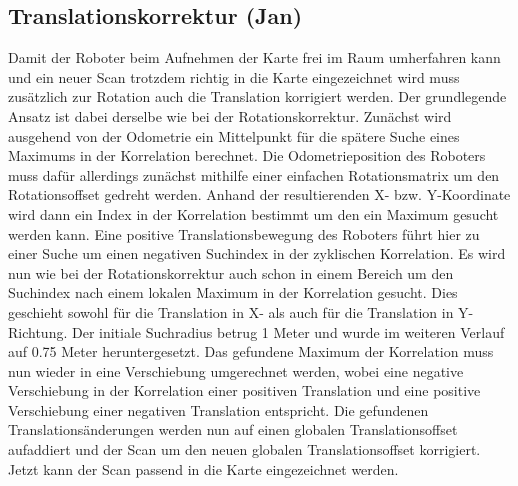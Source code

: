 \subsection{Translationskorrektur (Jan)}

Damit der Roboter beim Aufnehmen der Karte frei im Raum umherfahren kann und ein neuer Scan trotzdem richtig in die Karte eingezeichnet wird muss zusätzlich zur Rotation auch die Translation korrigiert werden. Der grundlegende Ansatz ist dabei derselbe wie bei der Rotationskorrektur. Zunächst wird ausgehend von der Odometrie ein Mittelpunkt für die spätere Suche eines Maximums in der Korrelation berechnet. Die Odometrieposition des Roboters muss dafür allerdings zunächst mithilfe einer einfachen Rotationsmatrix um den Rotationsoffset gedreht werden. Anhand der resultierenden X- bzw. Y-Koordinate wird dann ein Index in der Korrelation bestimmt um den ein Maximum gesucht werden kann. Eine positive Translationsbewegung des Roboters führt hier zu einer Suche um einen negativen Suchindex in der zyklischen Korrelation.
Es wird nun wie bei der Rotationskorrektur auch schon in einem Bereich um den Suchindex nach einem lokalen Maximum in der Korrelation gesucht. Dies geschieht sowohl für die Translation in X- als auch für die Translation in Y-Richtung. Der initiale Suchradius betrug 1 Meter und wurde im weiteren Verlauf auf 0.75 Meter heruntergesetzt.
Das gefundene Maximum der Korrelation muss nun wieder in eine Verschiebung umgerechnet werden, wobei eine negative Verschiebung in der Korrelation einer positiven Translation und eine positive Verschiebung einer negativen Translation entspricht.
Die gefundenen Translationsänderungen werden nun auf einen globalen Translationsoffset aufaddiert und der Scan um den neuen globalen Translationsoffset korrigiert.
Jetzt kann der Scan passend in die Karte eingezeichnet werden.

